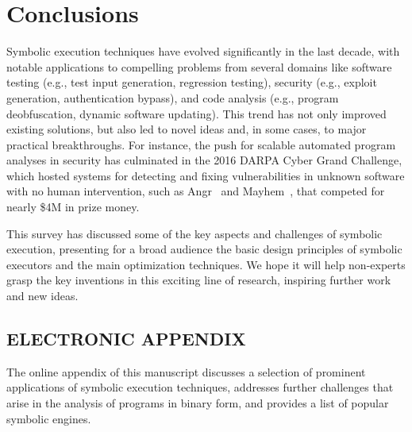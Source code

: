 
\section{Conclusions}
\label{se:conclusions}

Symbolic execution techniques have evolved significantly in the last decade, with notable applications to compelling problems from several domains like software testing (e.g., test input generation, regression testing), security (e.g., exploit generation, authentication bypass), and code analysis (e.g., program deobfuscation, dynamic software updating). This trend has not only improved existing solutions, but also led to novel ideas and, in some cases, to major practical breakthroughs. For instance, the push for scalable automated program analyses in security has culminated in the 2016 DARPA Cyber Grand Challenge, which hosted systems for detecting and fixing vulnerabilities in unknown software with no human intervention, such as {\sc Angr}~\cite{ANGR-SSP16} and {\sc Mayhem}~\cite{MAYHEM-SP12}, that competed for nearly \$4M in prize money.

This survey has discussed some of the key aspects and challenges of symbolic execution, presenting for a broad audience the basic design principles of symbolic executors and the main optimization techniques. We hope it will help non-experts grasp the key inventions in this exciting line of research, inspiring further work and new ideas.

{}

\subsection*{ELECTRONIC APPENDIX}
The online appendix of this manuscript discusses a selection of prominent applications of symbolic execution techniques, addresses further challenges that arise in the analysis of programs in binary form, and provides a list of popular symbolic engines.

\ifdefined\arxivver
